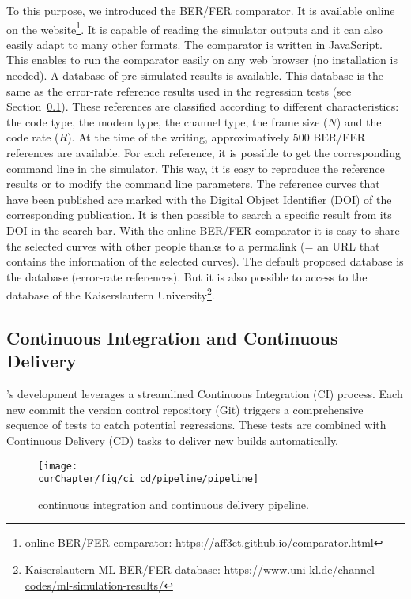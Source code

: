 To this purpose, we introduced the BER/FER comparator. It is available online on
the \AFFECT website\footnote{\AFFECT online BER/FER comparator:
\url{https://aff3ct.github.io/comparator.html}}. It is capable of reading the
\AFFECT simulator outputs and it can also easily adapt to many other formats.
The comparator is written in JavaScript. This enables to run the comparator
easily on any web browser (no installation is needed). A database of \AFFECT
pre-simulated results is available. This database is the same as the error-rate
reference results used in the regression tests (see
Section~\ref{sec:aff3ct_ci_cd}). These references are classified according to
different characteristics: the code type, the modem type, the channel type,
the frame size ($N$) and the code rate ($R$). At the time of the writing,
approximatively 500 BER/FER references are available. For each reference, it
is possible to get the corresponding command line in the \AFFECT simulator. This
way, it is easy to reproduce the reference results or to modify the command line
parameters. The reference curves that have been published are marked with
the Digital Object Identifier (DOI) of the corresponding publication. It is then
possible to search a specific result from its DOI in the search bar. With the
online BER/FER comparator it is easy to share the selected curves with other
people thanks to a permalink (= an URL that contains the information of the
selected curves). The default proposed database is the \AFFECT database
(error-rate references). But it is also possible to access to the database of
the Kaiserslautern University\footnote{Kaiserslautern ML BER/FER database:
\url{https://www.uni-kl.de/channel-codes/ml-simulation-results/}}.

\subsection{Continuous Integration and Continuous Delivery}
\label{sec:aff3ct_ci_cd}

\AFFECT's development leverages a streamlined Continuous Integration (CI)
process. Each new commit the version control repository (Git) triggers a
comprehensive sequence of tests to catch potential regressions. These tests are
combined with Continuous Delivery (CD) tasks to deliver new \AFFECT builds
automatically.

\begin{figure}[htp]
  \centering
  \texttt{[image: \\curChapter/fig/ci\_cd/pipeline/pipeline]}
  \caption{\AFFECT continuous integration and continuous delivery pipeline.}
  \label{fig:aff3ct_ci_cd_pipeline}
\end{figure}

